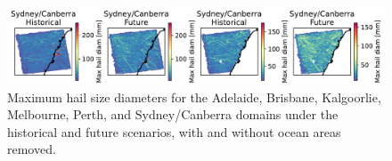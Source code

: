 \documentclass[]{agujournal2019}\usepackage[]{graphicx}\usepackage[]{xcolor}
\begin{document}
\begin{figure}[!ht]
      \includegraphics[width=\textwidth]{figures/maxes_Sydney_Canberra_hailcast_diam_max}
      \caption{Maximum hail size diameters for the Adelaide, Brisbane, Kalgoorlie, Melbourne, Perth, and Sydney/Canberra domains under the historical and future scenarios, with and without ocean areas removed.}
      \label{fig:maxes_with_removed_pts}
\end{figure}
\end{document}
